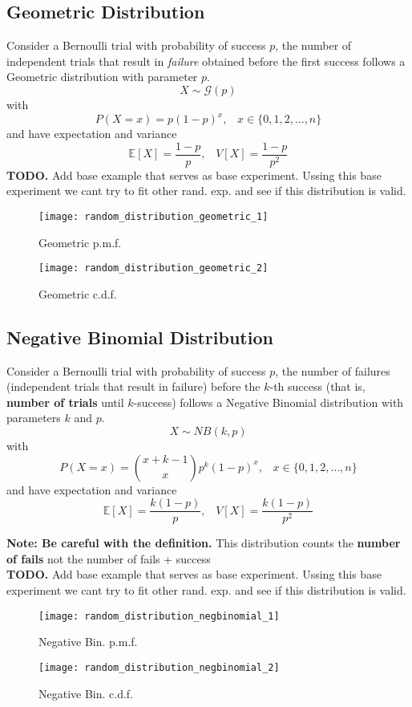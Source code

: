 \subsection{Geometric Distribution}
Consider a Bernoulli trial with probability of success $p$, the number of independent trials that result in \textit{failure} obtained before 
the first success follows a Geometric distribution with parameter $p$.
\[ X \sim \mathcal{G}(p)\]
with
\[ P(X=x) = p(1-p)^x,\;\;\; x \in \{0,1,2,\dots,n\} \]
and have expectation and variance
\[ \mathbb{E}[X] = \frac{1-p}{p},\;\;\; V[X] = \frac{1-p}{p^2} \]
\textbf{TODO.} Add base example that serves as base experiment. Ussing this base experiment we cant try to fit other rand. exp. and see
if this distribution is valid.
\begin{figure}[!ht]
    \begin{minipage}{0.45\linewidth}
      \texttt{[image: random\_distribution\_geometric\_1]}
      \caption{Geometric p.m.f.}
    \end{minipage}
    \hfill
    \begin{minipage}{0.45\linewidth}
      \texttt{[image: random\_distribution\_geometric\_2]}
      \caption{Geometric c.d.f.}
    \end{minipage}
\end{figure}

\subsection{Negative Binomial Distribution}
Consider a Bernoulli trial with probability of success $p$, the number of failures (independent trials that result in failure) before the $k$-th success 
(that is, \textbf{number of trials} until $k$-success) follows a Negative Binomial distribution with parameters $k$ and $p$.
\[ X \sim NB(k,p)\]
with
\[ P(X=x) = \binom{x+k-1}{x} p^k(1-p)^x,\;\;\; x \in \{0,1,2,\dots,n\} \]
and have expectation and variance
\[ \mathbb{E}[X] = \frac{k(1-p)}{p},\;\;\; V[X] = \frac{k(1-p)}{p^2} \]

\textbf{Note: Be careful with the definition.} This distribution counts the \textbf{number of fails} not the number of fails + success\\
\textbf{TODO.} Add base example that serves as base experiment. Ussing this base experiment we cant try to fit other rand. exp. and see
if this distribution is valid.
\begin{figure}[!ht]
    \begin{minipage}{0.45\linewidth}
      \texttt{[image: random\_distribution\_negbinomial\_1]}
      \caption{Negative Bin. p.m.f.}
    \end{minipage}
    \hfill
    \begin{minipage}{0.45\linewidth}
      \texttt{[image: random\_distribution\_negbinomial\_2]}
      \caption{Negative Bin. c.d.f.}
    \end{minipage}
\end{figure}

